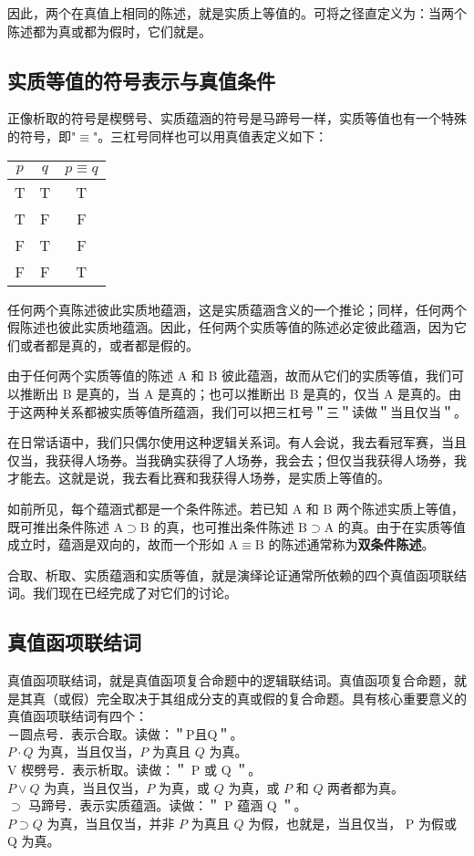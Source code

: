 因此，两个在真值上相同的陈述，就是实质上等值的。可将之径直定义为：当两个陈述都为真或都为假时，它们就是。

\subsection{实质等值的符号表示与真值条件}

正像析取的符号是楔劈号、实质蕴涵的符号是马蹄号一样，实质等值也有一个特殊的符号，即"$\equiv$"。三杠号同样也可以用真值表定义如下：

\begin{center}
\begin{tabular}{|ccc|}
\hline
$p$ & $q$ & $p \equiv q$ \\
\hline
T & T & T \\
T & F & F \\
F & T & F \\
F & F & T \\
\hline
\end{tabular}
\end{center}

任何两个真陈述彼此实质地蕴涵，这是实质蕴涵含义的一个推论；同样，任何两个假陈述也彼此实质地蕴涵。因此，任何两个实质等值的陈述必定彼此蕴涵，因为它们或者都是真的，或者都是假的。

由于任何两个实质等值的陈述 A 和 B 彼此蕴涵，故而从它们的实质等值，我们可以推断出 B 是真的，当 A 是真的；也可以推断出 B 是真的，仅当 A 是真的。由于这两种关系都被实质等值所蕴涵，我们可以把三杠号＂三＂读做＂当且仅当＂。

在日常话语中，我们只偶尔使用这种逻辑关系词。有人会说，我去看冠军赛，当且仅当，我获得人场券。当我确实获得了人场券，我会去；但仅当我获得人场券，我才能去。这就是说，我去看比赛和我获得人场券，是实质上等值的。

如前所见，每个蕴涵式都是一个条件陈述。若已知 A 和 B 两个陈述实质上等值，既可推出条件陈述 $\mathrm{A} \supset \mathrm{B}$ 的真，也可推出条件陈述 $\mathrm{B} \supset \mathrm{A}$ 的真。由于在实质等值成立时，蕴涵是双向的，故而一个形如 $\mathrm{A} \equiv \mathrm{B}$ 的陈述通常称为\textbf{双条件陈述}。

合取、析取、实质蕴涵和实质等值，就是演绎论证通常所依赖的四个真值函项联结词。我们现在已经完成了对它们的讨论。

\subsection{真值函项联结词}
真值函项联结词，就是真值函项复合命题中的逻辑联结词。真值函项复合命题，就是其真（或假）完全取决于其组成分支的真或假的复合命题。具有核心重要意义的真值函项联结词有四个：\\
－圆点号．表示合取。读做：＂P且Q＂。\\
$P \cdot Q$ 为真，当且仅当，$P$ 为真且 $Q$ 为真。\\
V 楔劈号．表示析取。读做：＂ P 或 Q ＂。\\
$P \vee Q$ 为真，当且仅当，$P$ 为真，或 $Q$ 为真，或 $P$ 和 $Q$ 两者都为真。\\
$\supset$ 马蹄号．表示实质蕴涵。读做：＂ P 蕴涵 Q ＂。\\
$P \supset Q$ 为真，当且仅当，并非 $P$ 为真且 $Q$ 为假，也就是，当且仅当， P 为假或 Q 为真。

